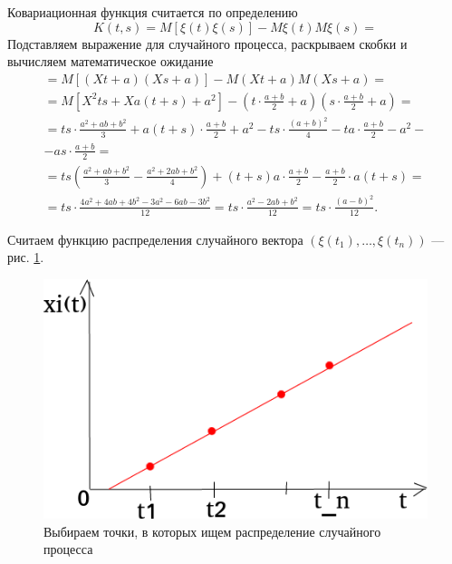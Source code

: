Ковариационная функция считается по определению
$$K \left( t, s \right) =
  M \left[ \xi \left( t \right) \xi \left( s \right) \right] -
  M \xi \left( t \right) M \xi \left( s \right) =$$
Подставляем выражение для случайного процесса, раскрываем скобки и вычисляем математическое ожидание
\begin{equation*}
  \begin{split}
    = M \left[ \left( Xt + a \right) \left( Xs + a \right) \right] -
    M \left( Xt + a \right) M \left( Xs + a \right) = \\
    = M \left[ X^2 ts + Xa \left(t + s \right) + a^2 \right] -
    \left( t \cdot \frac{a + b}{2} + a \right) \left( s \cdot \frac{a + b}{2} + a \right) = \\
    = ts \cdot \frac{a^2 + ab + b^2}{3} + a \left( t + s \right) \cdot \frac{a + b}{2} + a^2 -
    ts \cdot \frac{ \left( a + b \right)^2}{4} - ta \cdot \frac{a + b}{2} - a^2 - \\
    - as \cdot \frac{a + b}{2} = \\
    = ts \left( \frac{a^2 + ab + b^2}{3} - \frac{a^2 + 2ab + b^2}{4} \right) +
    \left(t + s \right) a \cdot \frac{a + b}{2} - \frac{a + b}{2} \cdot a \left( t + s \right) = \\
    = ts \cdot \frac{4a^2 + 4ab + 4b^2 - 3a^2 - 6ab - 3b^2}{12} =
    ts \cdot \frac{a^2 - 2ab + b^2}{12} =
    ts \cdot \frac{ \left( a - b \right)^2}{12}.
  \end{split}
\end{equation*}

Считаем функцию распределения случайного вектора
$ \left( \xi \left( t_1 \right), \dotsc, \xi \left( t_n \right) \right) $ --- рис. \ref{fig:2121}.

\begin{figure}[h!]
 \centering
 \includegraphics[width=.5\textwidth]{./pictures/2_12_1.png}
 \caption{Выбираем точки, в которых ищем распределение случайного процесса}
 \label{fig:2121}
\end{figure}

